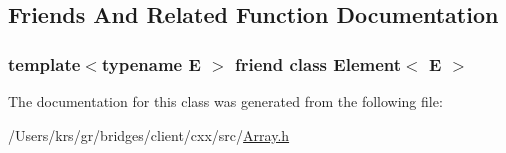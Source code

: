 \subsection{Friends And Related Function Documentation}
\hypertarget{classbridges_1_1_array_a8c6ff2a8dd3e27346dd25f588a78828a}{}
\subsubsection[{Element$<$ E $>$}]{\setlength{\rightskip}{0pt plus 5cm}template$<$typename E $>$ friend class {\bf Element}$<$ E $>$\hspace{0.3cm}{\ttfamily [friend]}}\label{classbridges_1_1_array_a8c6ff2a8dd3e27346dd25f588a78828a}


The documentation for this class was generated from the following file\+:\begin{DoxyCompactItemize}
\item 
/\+Users/krs/gr/bridges/client/cxx/src/\hyperlink{_array_8h}{Array.\+h}\end{DoxyCompactItemize}
